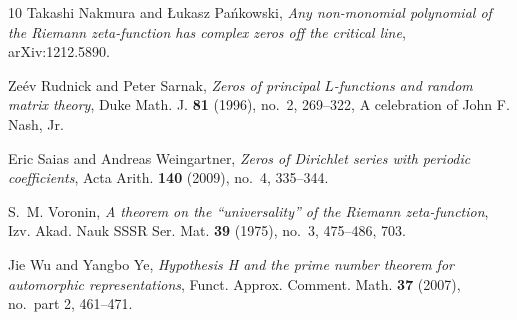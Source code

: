 \documentclass[11pt]{amsart}
\theoremstyle{remark}
\numberwithin{theorem}{section}
\numberwithin{equation}{section}
\begin{document}
\begin{thebibliography}{10}
Takashi Nakmura and {\L}ukasz Pa\'nkowski, \emph{Any non-monomial polynomial of
  the {R}iemann zeta-function has complex zeros off the critical line},
  arXiv:1212.5890.

Ze{\'e}v Rudnick and Peter Sarnak, \emph{Zeros of principal {$L$}-functions and
  random matrix theory}, Duke Math. J. \textbf{81} (1996), no.~2, 269--322, A
  celebration of John F. Nash, Jr. 

Eric Saias and Andreas Weingartner, \emph{Zeros of {D}irichlet series with
  periodic coefficients}, Acta Arith. \textbf{140} (2009), no.~4, 335--344.

S.~M. Voronin, \emph{A theorem on the ``universality'' of the {R}iemann
  zeta-function}, Izv. Akad. Nauk SSSR Ser. Mat. \textbf{39} (1975), no.~3,
  475--486, 703. 

Jie Wu and Yangbo Ye, \emph{Hypothesis {H} and the prime number theorem for
  automorphic representations}, Funct. Approx. Comment. Math. \textbf{37}
  (2007), no.~part 2, 461--471. 

\end{thebibliography}
\end{document}

